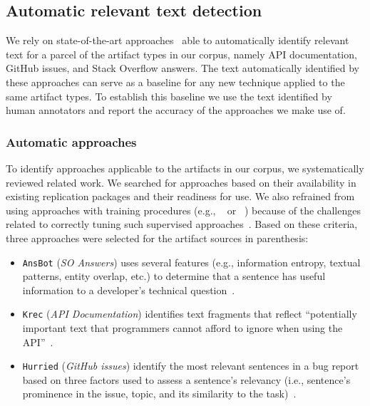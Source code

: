
\subsection{Automatic relevant text detection}
\label{cp4:relevant-text-auto}





We rely on state-of-the-art approaches~\cite{nadi2020, Robillard2015, Lotufo2012, Xu2017} able to automatically identify relevant text for a parcel of the  artifact types in our corpus, namely API documentation, GitHub issues, and Stack Overflow answers.
The text automatically identified by these approaches can serve as a baseline for 
any new technique applied to the same artifact types. 
To establish this baseline we use the text identified by human annotators and report the accuracy of the approaches we make use of.


\subsubsection{Automatic approaches}


To identify approaches applicable to the artifacts in our corpus, we systematically reviewed related work. We searched for approaches based on their availability in existing replication packages and their readiness for use.
We also refrained from using approaches with training procedures (e.g., ~\cite{liu2020} or ~\cite{Treude2016}) because of the challenges related to correctly tuning such supervised approaches~\cite{Chaparro2017, fucci2019}. Based on these criteria, three approaches were selected for the artifact sources in parenthesis:


\begin{itemize}[leftmargin=\parindent, font=\normalfont\itshape]
    \item \texttt{\acs{AnsBot}} (\textit{SO Answers}) uses several features (e.g., information entropy, textual patterns, entity overlap, etc.) to determine that a sentence has useful information to a developer's technical question~\cite{Xu2017}.
    
    \item \texttt{\acs{Krec}} (\textit{API Documentation}) identifies text fragments that reflect ``potentially important text that programmers cannot afford to ignore when using the API''~\cite{Robillard2015}.
    
    \item \texttt{\acs{Hurried}} (\textit{GitHub issues}) identify the most relevant sentences in a bug report based on three factors used to assess a sentence's relevancy (i.e., sentence's prominence in the issue, topic, and its similarity to the task)~\cite{Lotufo2012}.
\end{itemize}


